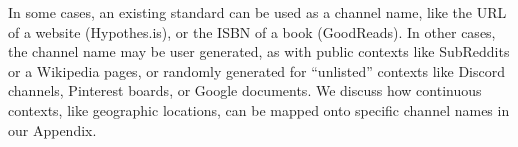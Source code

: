 In some cases, an existing standard can be used as a channel
name, like the URL of a website (Hypothes.is),
or the ISBN of a book (GoodReads).
In other cases, the channel name may be user generated,
as with public contexts like SubReddits or a Wikipedia pages,
or randomly generated for ``unlisted'' contexts like
Discord channels, Pinterest boards, or Google documents.
We discuss how continuous contexts, like geographic locations, can be
mapped onto specific channel names in our Appendix.




